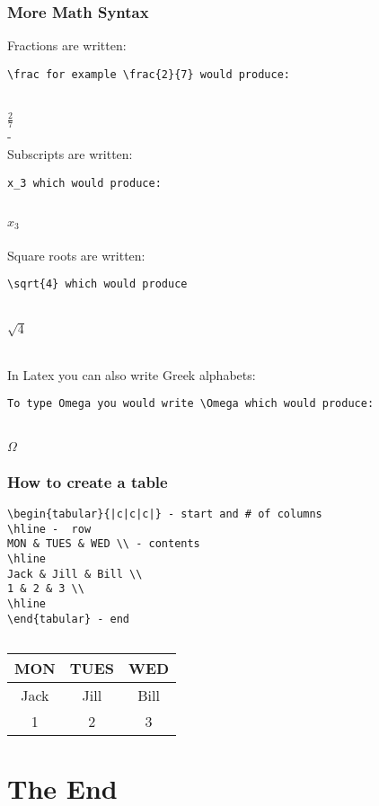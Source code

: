 \documentclass[aspectratio=1610]{beamer}
\begin{document}
\begin{frame}[fragile]
    \frametitle{More Math Syntax}
    Fractions are written: 
    \\
    \begin{verbatim}
\frac for example \frac{2}{7} would produce:

\end{verbatim}
\\
$\frac{2}{7}$
\\ - \\
Subscripts are written:
\\
\begin{verbatim}
x_3 which would produce:
\end{verbatim}
\\
$x_3$
\\ \\
Square roots are written: 
\begin{verbatim}
\sqrt{4} which would produce

\end{verbatim}
  \\
  $\sqrt{4}$

  \\
  In Latex you can also write Greek alphabets:
    \begin{verbatim}
To type Omega you would write \Omega which would produce:
\end{verbatim}
\\
$\Omega$
\\

\end{frame}

\begin{frame}[fragile]
    \frametitle{How to create a table}
      \begin{verbatim}
\begin{tabular}{|c|c|c|} - start and # of columns
\hline -  row
MON & TUES & WED \\ - contents
\hline
Jack & Jill & Bill \\
1 & 2 & 3 \\
\hline
\end{tabular} - end
      \end{verbatim}
    \begin{verbatim}

\end{verbatim}
   \begin{tabular}{|c|c|c|}
\hline
MON & TUES & WED \\
\hline
Jack & Jill & Bill \\
1 & 2 & 3 \\
\hline
\end{tabular}

\end{frame}






\section{The End}
\end{document}
